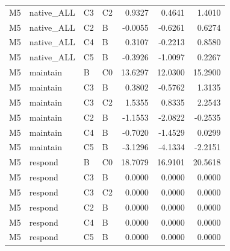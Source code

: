 \begin{longtable}{llllrrr}
M5 & native\_ALL & C3 & C2 & 0.9327 & 0.4641 & 1.4010 \\
M5 & native\_ALL & C2 & B & -0.0055 & -0.6261 & 0.6274 \\
M5 & native\_ALL & C4 & B & 0.3107 & -0.2213 & 0.8580 \\
M5 & native\_ALL & C5 & B & -0.3926 & -1.0097 & 0.2267 \\
M5 & maintain & B & C0 & 13.6297 & 12.0300 & 15.2900 \\
M5 & maintain & C3 & B & 0.3802 & -0.5762 & 1.3135 \\
M5 & maintain & C3 & C2 & 1.5355 & 0.8335 & 2.2543 \\
M5 & maintain & C2 & B & -1.1553 & -2.0822 & -0.2535 \\
M5 & maintain & C4 & B & -0.7020 & -1.4529 & 0.0299 \\
M5 & maintain & C5 & B & -3.1296 & -4.1334 & -2.2151 \\
M5 & respond & B & C0 & 18.7079 & 16.9101 & 20.5618 \\
M5 & respond & C3 & B & 0.0000 & 0.0000 & 0.0000 \\
M5 & respond & C3 & C2 & 0.0000 & 0.0000 & 0.0000 \\
M5 & respond & C2 & B & 0.0000 & 0.0000 & 0.0000 \\
M5 & respond & C4 & B & 0.0000 & 0.0000 & 0.0000 \\
M5 & respond & C5 & B & 0.0000 & 0.0000 & 0.0000 \\
\end{longtable}
